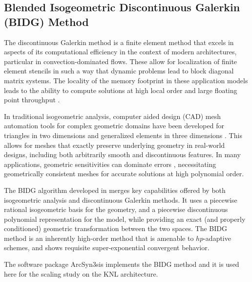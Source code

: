 \subsection{Blended Isogeometric Discontinuous Galerkin (BIDG) Method}
\label{sec:isogeometric}

The discontinuous Galerkin method is a finite element method that excels in
aspects of its computational efficiency in the context of modern architectures,
particular in convection-dominated flows.  These allow for localization of
finite element stencils in such a way that dynamic problems lead to block
diagonal matrix systems.  The locality of the memory footprint in these
application models leads to the ability to compute solutions at high local
order and large floating point throughput \cite{Klockner20097863}.

In traditional isogeometric analysis, computer aided design (CAD) mesh
automation tools for complex geometric domains have been developed for
triangles in two dimensions \cite{Engvall2016378} and generalized elements in
three dimensions \cite{EngvallPress}.  This allows for meshes that exactly
preserve underlying geometry in real-world designs, including both arbitrarily
smooth and discontinuous features.  In many applications, geometric
sensitivities can dominate errors  \cite{Michoski2016658,Wirasaet2015597},
necessitating geometrically consistent meshes for accurate solutions at high
polynomial order.

The BIDG algorithm developed in \cite{Michoski2016658} merges key capabilities
offered by both isogeometric analysis and discontinuous Galerkin methods.  It
uses a piecewise rational isogeometric basis for the geometry, and a piecewise
discontinuous polynomial representation for the model, while providing an exact
(and properly conditioned) geometric transformation between the two spaces. The
BIDG method is an inherently high-order method that is amenable to
$hp$-adaptive schemes, and shows requisite super-exponential convergent
behavior.

The software package ArcSyn3sis implements the BIDG method and it is used here
for the scaling study on the KNL architecture.

